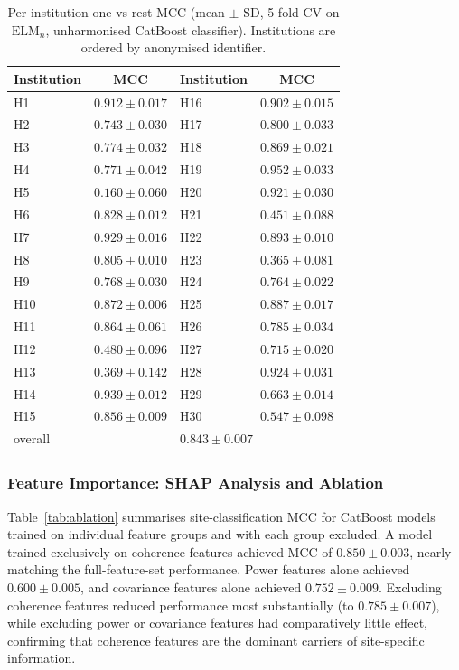 \documentclass[preprint,12pt]{elsarticle}
\begin{document}
\begin{table}[htbp]
  \centering
  \caption{Per-institution one-vs-rest MCC (mean $\pm$ SD, 5-fold CV
    on $\mathrm{ELM}_n$, unharmonised CatBoost classifier).
    Institutions are ordered by anonymised identifier.}
  \label{tab:per_site_mcc}
  \begin{tabular}{lc@{\quad}lc}
    \toprule
    \textbf{Institution} & \textbf{MCC} &
    \textbf{Institution} & \textbf{MCC} \\
    \midrule
    H1  & $0.912 \pm 0.017$ & H16 & $0.902 \pm 0.015$ \\
    H2  & $0.743 \pm 0.030$ & H17 & $0.800 \pm 0.033$ \\
    H3  & $0.774 \pm 0.032$ & H18 & $0.869 \pm 0.021$ \\
    H4  & $0.771 \pm 0.042$ & H19 & $0.952 \pm 0.033$ \\
    H5  & $0.160 \pm 0.060$ & H20 & $0.921 \pm 0.030$ \\
    H6  & $0.828 \pm 0.012$ & H21 & $0.451 \pm 0.088$ \\
    H7  & $0.929 \pm 0.016$ & H22 & $0.893 \pm 0.010$ \\
    H8  & $0.805 \pm 0.010$ & H23 & $0.365 \pm 0.081$ \\
    H9  & $0.768 \pm 0.030$ & H24 & $0.764 \pm 0.022$ \\
    H10 & $0.872 \pm 0.006$ & H25 & $0.887 \pm 0.017$ \\
    H11 & $0.864 \pm 0.061$ & H26 & $0.785 \pm 0.034$ \\
    H12 & $0.480 \pm 0.096$ & H27 & $0.715 \pm 0.020$ \\
    H13 & $0.369 \pm 0.142$ & H28 & $0.924 \pm 0.031$ \\
    H14 & $0.939 \pm 0.012$ & H29 & $0.663 \pm 0.014$ \\
    H15 & $0.856 \pm 0.009$ & H30 & $0.547 \pm 0.098$ \\
    \midrule
    \multicolumn{2}{l}{overall} &
    \multicolumn{2}{l}{$0.843 \pm 0.007$} \\
    \bottomrule
  \end{tabular}
\end{table}

\subsubsection{Feature Importance: SHAP Analysis and Ablation}
\label{subsubsec:shap_results}

Table~\ref{tab:ablation} summarises site-classification MCC for
CatBoost models trained on individual feature groups and with each
group excluded.
A model trained exclusively on coherence features achieved MCC of
$0.850 \pm 0.003$, nearly matching the full-feature-set performance.
Power features alone achieved $0.600 \pm 0.005$, and covariance
features alone achieved $0.752 \pm 0.009$.
Excluding coherence features reduced performance most substantially
(to $0.785 \pm 0.007$), while excluding power or covariance features
had comparatively little effect, confirming that coherence features
are the dominant carriers of site-specific information.
\end{document}

